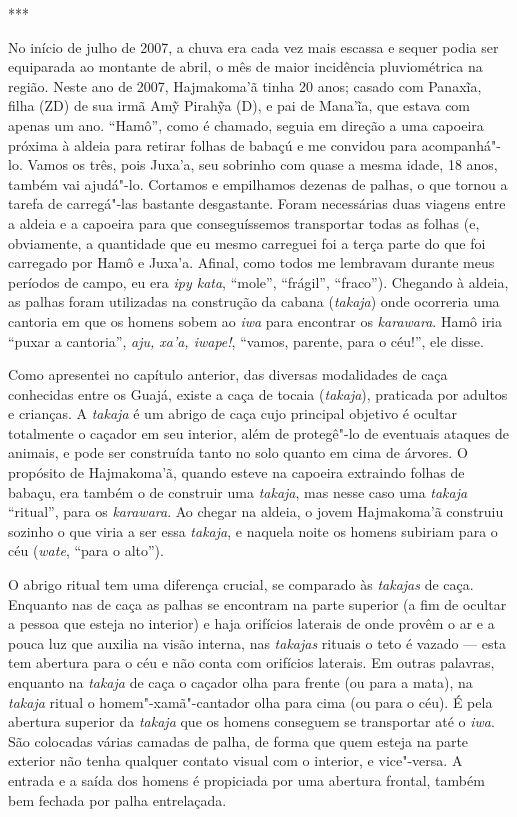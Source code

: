 \begin{center}
***
\end{center}

No início de julho de 2007, a chuva era cada vez mais escassa e sequer
podia ser equiparada ao montante de abril, o mês de maior incidência
pluviométrica na região. Neste ano de 2007, Hajmakoma'ã tinha 20 anos;
casado com Panaxĩa, filha (ZD) de sua irmã Amỹ Pirahỹa (D), e pai de
Mana'ĩa, que estava com apenas um ano. ``Hamô'', como é chamado, seguia
em direção a uma capoeira próxima à aldeia para retirar folhas de babaçú
e me convidou para acompanhá"-lo. Vamos os três, pois Juxa'a, seu
sobrinho com quase a mesma idade, 18 anos, também vai ajudá"-lo. Cortamos
e empilhamos dezenas de palhas, o que tornou a tarefa de carregá"-las
bastante desgastante. Foram necessárias duas viagens entre a aldeia e a
capoeira para que conseguíssemos transportar todas as folhas (e,
obviamente, a quantidade que eu mesmo carreguei foi a terça parte do que
foi carregado por Hamô e Juxa'a. Afinal, como todos me lembravam durante
meus períodos de campo, eu era \emph{ipy kata}, ``mole'', ``frágil'',
``fraco''). Chegando à aldeia, as palhas foram utilizadas na construção da
cabana (\emph{takaja}) onde ocorreria uma cantoria em que os homens
sobem ao \emph{iwa} para encontrar os \emph{karawara}. Hamô iria ``puxar
a cantoria'', \emph{aju, xa'a, iwape!}, ``vamos, parente, para o céu!'',
ele disse.

Como apresentei no capítulo anterior, das diversas modalidades de caça
conhecidas entre os Guajá, existe a caça de tocaia (\emph{takaja}),
praticada por adultos e crianças. A \emph{takaja} é um abrigo de caça
cujo principal objetivo é ocultar totalmente o caçador em seu interior,
além de protegê"-lo de eventuais ataques de animais, e pode ser
construída tanto no solo quanto em cima de árvores. O propósito de
Hajmakoma'ã, quando esteve na capoeira extraindo folhas de babaçu, era
também o de construir uma \emph{takaja}, mas nesse caso uma
\emph{takaja} ``ritual'', para os \emph{karawara}. Ao chegar na aldeia, o
jovem Hajmakoma'ã construiu sozinho o que viria a ser essa
\emph{takaja}, e naquela noite os homens subiriam para o céu
(\emph{wate}, ``para o alto'').

O abrigo ritual tem uma diferença crucial, se comparado às
\emph{takajas} de caça. Enquanto nas de caça as palhas se encontram na
parte superior (a fim de ocultar a pessoa que esteja no interior) e haja
orifícios laterais de onde provêm o ar e a pouca luz que auxilia na
visão interna, nas \emph{takajas} rituais o teto é vazado --- esta tem
abertura para o céu e não conta com orifícios laterais. Em outras
palavras, enquanto na \emph{takaja} de caça o caçador olha para frente
(ou para a mata), na \emph{takaja} ritual o homem"-xamã"-cantador olha
para cima (ou para o céu). É pela abertura superior da \emph{takaja} que
os homens conseguem se transportar até o \emph{iwa}. São colocadas
várias camadas de palha, de forma que quem esteja na parte exterior não
tenha qualquer contato visual com o interior, e vice"-versa. A entrada e
a saída dos homens é propiciada por uma abertura frontal, também bem
fechada por palha entrelaçada.

